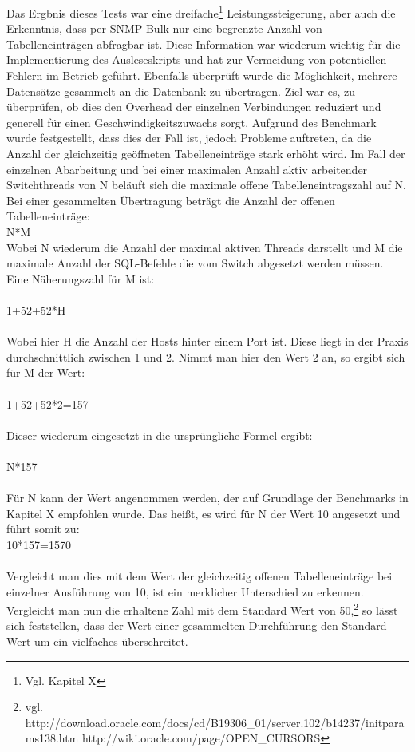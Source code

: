 Das Ergbnis dieses Tests war eine dreifache\footnote{Vgl. Kapitel X} Leistungssteigerung, aber auch die Erkenntnis, dass per SNMP-Bulk nur eine begrenzte Anzahl von Tabelleneinträgen abfragbar ist. Diese Information war wiederum wichtig für die Implementierung des Ausleseskripts und hat zur Vermeidung von potentiellen Fehlern im Betrieb geführt. Ebenfalls überprüft wurde die Möglichkeit, mehrere Datensätze gesammelt an die Datenbank zu übertragen.
Ziel war es, zu überprüfen, ob dies den Overhead der einzelnen Verbindungen reduziert und generell für einen Geschwindigkeitszuwachs sorgt. Aufgrund des Benchmark wurde festgestellt, dass dies der Fall ist, jedoch Probleme auftreten, da die Anzahl der gleichzeitig geöffneten Tabelleneinträge stark erhöht wird. Im Fall der einzelnen Abarbeitung und bei einer maximalen Anzahl aktiv arbeitender Switchthreads von N beläuft sich die maximale offene Tabelleneintragszahl auf N.
\\ Bei einer gesammelten Übertragung beträgt die Anzahl der offenen Tabelleneinträge:\\
N*M\\
Wobei N wiederum die Anzahl der maximal aktiven Threads darstellt und M die maximale Anzahl der SQL-Befehle die vom Switch abgesetzt werden müssen. Eine Näherungszahl für M ist:\\
\\
1+52+52*H\\
\\
Wobei hier H die Anzahl der Hosts hinter einem Port ist. Diese liegt in der Praxis durchschnittlich zwischen 1 und 2. Nimmt man hier den Wert 2 an, so ergibt sich für M der Wert:\\
\\
1+52+52*2=157\\
\\
Dieser wiederum eingesetzt in die ursprüngliche Formel ergibt:\\
\\
N*157\\
\\
Für N kann der Wert angenommen werden, der auf Grundlage der Benchmarks in Kapitel X empfohlen wurde. Das heißt, es wird für N der Wert 10 angesetzt und führt somit zu:
\\
10*157=1570\\
\\
Vergleicht man dies mit dem Wert der gleichzeitig offenen Tabelleneinträge bei einzelner Ausführung von 10, ist ein merklicher Unterschied zu erkennen. Vergleicht man nun die erhaltene Zahl mit dem Standard Wert von 50,\footnote{vgl. http://download.oracle.com/docs/cd/B19306\_01/server.102/b14237/initparams138.htm  http://wiki.oracle.com/page/OPEN\_CURSORS} so lässt sich feststellen, dass der Wert einer gesammelten Durchführung den Standard-Wert um ein vielfaches überschreitet.

